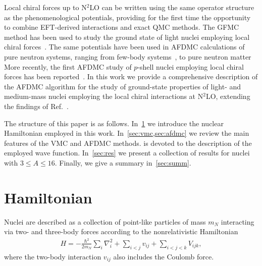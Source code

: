 \documentclass[aps,prc,twocolumn,superscriptaddress,floatfix]{revtex4-1}
\begin{document}
Local chiral forces up to N$^2$LO can be written using the same operator
structure as the phenomenological potentials, providing for the first time
the opportunity to combine EFT-derived interactions and exact QMC methods.
The GFMC method has been used to study the ground state of light nuclei employing 
local chiral forces~\cite{Gezerlis:2013,Gezerlis:2014,Lynn:2014,Tews:2016,Lynn:2016,Piarulli:2016,Lynn:2017,Piarulli:2018}.
The same potentials have been used in AFDMC calculations of pure neutron systems, 
ranging from few-body systems~\cite{Klos:2016,Zhao:2016,Gandolfi:2017}, to pure
neutron matter~\cite{Gezerlis:2013,Gezerlis:2014,Tews:2016}
More recently, the first AFDMC study of $p$-shell nuclei employing local
chiral forces has been reported~\cite{Lonardoni:2017afdmc}.
In this work we provide a comprehensive description of the AFDMC algorithm 
for the study of ground-state properties of light- and medium-mass nuclei 
employing the local chiral interactions at N$^2$LO, extending
the findings of Ref.~\cite{Lonardoni:2017afdmc}.

The structure of this paper is as follows. 
In~\cref{sec:ham} we introduce the nuclear Hamiltonian employed in this work.
In~\cref{sec:vmc,sec:afdmc} we review the main features of the VMC and AFDMC methods.
 is devoted to the description of the employed wave function. 
In~\cref{sec:res} we present a collection of results for nuclei
with $3\le A\le 16$. 
Finally, we give a summary in~\cref{sec:summ}.


\section{Hamiltonian}
\label{sec:ham}
Nuclei are described as a collection of point-like particles of mass $m_N$ interacting 
via two- and three-body forces according to the nonrelativistic Hamiltonian
\begin{align}
	H=-\frac{\hbar^2}{2m_N}\sum_i \nabla_i^2+\sum_{i<j}v_{ij}+\sum_{i<j<k}V_{ijk} ,
\end{align}
where the two-body interaction $v_{ij}$ also includes the Coulomb force.
\end{document}
